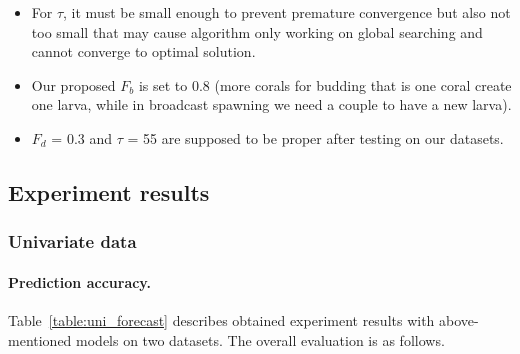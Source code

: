 \documentclass[11pt,twoside]{article}
\begin{document}
\begin{multicols}{2}
\begin{itemize}
	\begin{itemize} 
		\item For $\tau$, it must be small enough to prevent premature convergence but also not too small that may cause algorithm only working on global searching and cannot converge to optimal solution. 
		\item Our proposed $F_{b}$ is set to 0.8 (more corals for budding that is one coral create one larva, while in broadcast spawning we need a couple to have a new larva).
		\item $F_{d}$ = 0.3 and $\tau$ = 55 are supposed to be proper after testing on our datasets.
	\end{itemize}
\end{itemize}


\subsection{Experiment results}
\label{results_discussion}

\subsubsection{Univariate data}
\paragraph{\textbf{Prediction accuracy.}} Table~\ref{table:uni_forecast} describes obtained experiment results with above-mentioned models on two datasets. The overall evaluation is as follows.




\end{multicols}
\end{document}
